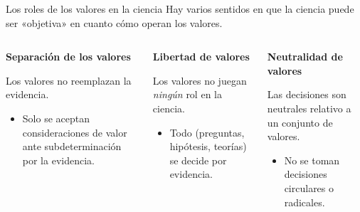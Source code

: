 \documentclass[%
            9pt,
                spanish, %
                    ignorenonframetext,
                aspectratio=169, %
        ]{beamer}
\providecommand{\tightlist}{}
\begin{document}
\begin{frame}{Los roles de los valores en la ciencia}
\label{los-roles-de-los-valores-en-la-ciencia}
Hay varios sentidos en que la ciencia puede ser «objetiva» en cuanto
cómo operan los valores. \pause

\begin{columns}[T,onlytextwidth]
\begin{column}{0.3\textwidth}
\textbf{Separación de los valores}

\pause

Los valores no reemplazan la evidencia.

\pause

\begin{itemize}
\tightlist
\item
  Solo se aceptan consideraciones de valor ante subdeterminación por la
  evidencia. \pause
\end{itemize}
\end{column}

\begin{column}{0.3\textwidth}
\textbf{Libertad de valores}

\pause

Los valores no juegan \emph{ningún} rol en la ciencia.

\pause

\begin{itemize}
\tightlist
\item
  Todo (preguntas, hipótesis, teorías) se decide por evidencia. \pause
\end{itemize}
\end{column}

\begin{column}{0.3\textwidth}
\textbf{Neutralidad de valores}

\pause

Las decisiones son neutrales relativo a un conjunto de valores.

\pause

\begin{itemize}
\tightlist
\item
  No se toman decisiones circulares o radicales.
\end{itemize}
\end{column}
\end{columns}
\end{frame}
\end{document}
